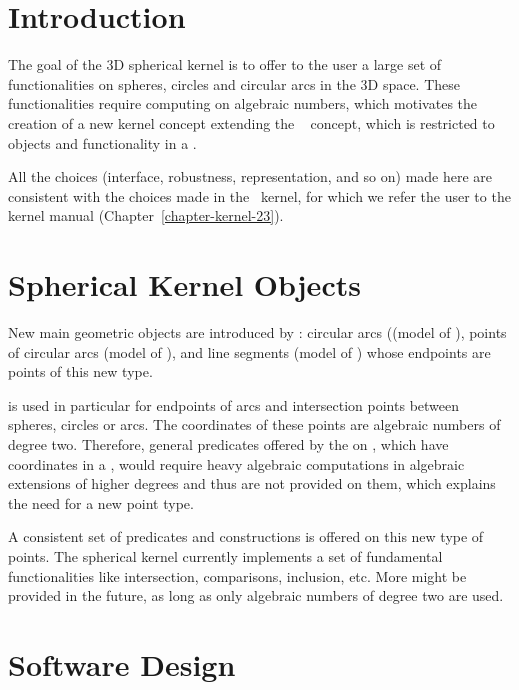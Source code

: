 \section{Introduction}

The goal of the 3D spherical kernel is to offer to the user a large
set of functionalities on spheres, circles and circular arcs in the 3D
space. These functionalities require computing on algebraic numbers,
which motivates the creation of a new kernel concept extending the
\cgal\  concept, which is restricted to objects
and functionality in a .

All the choices (interface, robustness, representation, and so on)
made here are consistent with the choices made in the \cgal\ kernel,
for which we refer the user to the kernel manual
(Chapter~\ref{chapter-kernel-23}).

\section{Spherical Kernel Objects\label{section-SK-objects}}

New main geometric objects are introduced by :
circular arcs ((model of ), points
of circular arcs (model of ),
and line segments (model of ) whose
endpoints are points of this new type.

 is used in particular for
endpoints of arcs and intersection points between spheres, circles or
arcs. The coordinates of these points are algebraic numbers of degree
two. Therefore, general predicates offered by the  on
, which have coordinates in a ,
would require heavy algebraic computations in algebraic extensions
of higher degrees and thus are not provided on
them, which explains the need for a new point type. 

A consistent set of predicates and constructions is offered on this
new type of points. The spherical kernel currently implements a set of
fundamental functionalities like intersection, comparisons, inclusion,
etc. More might be provided in the future, as long as only algebraic
numbers of degree two are used.

\section{Software Design}

